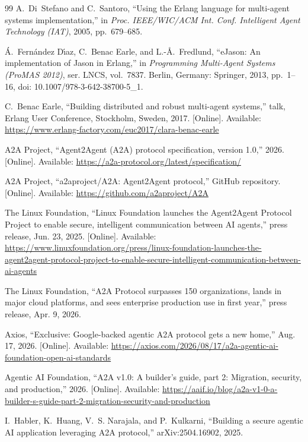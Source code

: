 \documentclass[conference,letterpaper]{IEEEtran}
\begin{document}
\begin{thebibliography}{99}
A.~Di~Stefano and C.~Santoro, ``Using the Erlang language for multi-agent
systems implementation,'' in \emph{Proc. IEEE/WIC/ACM Int. Conf. Intelligent
Agent Technology (IAT)}, 2005, pp.~679--685.

\'{A}.~Fern\'{a}ndez D\'{\i}az, C.~Benac Earle, and L.-\AA.~Fredlund,
``eJason: An implementation of Jason in Erlang,'' in \emph{Programming
Multi-Agent Systems (ProMAS 2012)}, ser. LNCS, vol.~7837. Berlin, Germany:
Springer, 2013, pp.~1--16, doi: 10.1007/978-3-642-38700-5\_1.

C.~Benac Earle, ``Building distributed and robust multi-agent systems,''
talk, Erlang User Conference, Stockholm, Sweden, 2017. [Online]. Available:
\url{https://www.erlang-factory.com/euc2017/clara-benac-earle}

A2A Project, ``Agent2Agent (A2A) protocol specification, version 1.0,''
2026. [Online]. Available:
\url{https://a2a-protocol.org/latest/specification/}

A2A Project, ``a2aproject/A2A: Agent2Agent protocol,'' GitHub repository.
[Online]. Available: \url{https://github.com/a2aproject/A2A}

The Linux Foundation, ``Linux Foundation launches the Agent2Agent Protocol
Project to enable secure, intelligent communication between AI agents,''
press release, Jun. 23, 2025. [Online]. Available:
\url{https://www.linuxfoundation.org/press/linux-foundation-launches-the-agent2agent-protocol-project-to-enable-secure-intelligent-communication-between-ai-agents}

The Linux Foundation, ``A2A Protocol surpasses 150 organizations, lands in
major cloud platforms, and sees enterprise production use in first year,''
press release, Apr. 9, 2026.

Axios, ``Exclusive: Google-backed agentic A2A protocol gets a new home,''
Aug. 17, 2026. [Online]. Available:
\url{https://axios.com/2026/08/17/a2a-agentic-ai-foundation-open-ai-standards}

Agentic AI Foundation, ``A2A v1.0: A builder's guide, part 2: Migration,
security, and production,'' 2026. [Online]. Available:
\url{https://aaif.io/blog/a2a-v1-0-a-builder-s-guide-part-2-migration-security-and-production}

I.~Habler, K.~Huang, V.~S. Narajala, and P.~Kulkarni, ``Building a secure
agentic AI application leveraging A2A protocol,'' arXiv:2504.16902, 2025.


\end{thebibliography}
\end{document}
